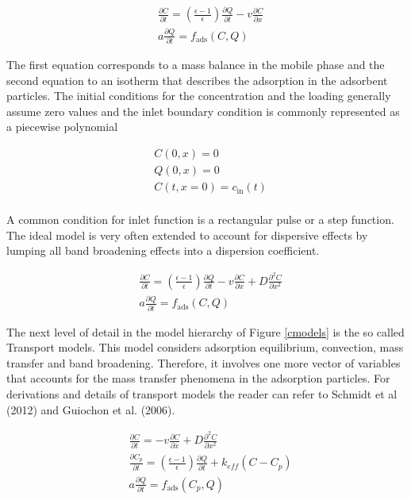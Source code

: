 \documentclass[paper=a4, fontsize=11pt]{scrartcl}
\begin{document}
\begin{align}
\label{idealm}
& \frac{\partial C}{\partial t} = \left(\frac{\epsilon-1}{\epsilon}\right) \frac{\partial Q}{\partial t}-v\frac{\partial C}{\partial x} \\
& a \frac{\partial Q}{\partial t} = f_{\text{ads}}(C,Q)
\end{align}

The first equation corresponds to a mass balance in the mobile phase and the second equation to an isotherm that describes the adsorption in the adsorbent particles. The initial conditions for the concentration and
the loading generally assume zero values and the inlet boundary condition is commonly represented as a piecewise polynomial

\begin{align*}
&C(0,x) = 0\\
&Q(0,x) = 0\\
&C(t,x=0) = c_{\text{in}}(t)\\
\end{align*}

A common condition for inlet function is a rectangular pulse or a step function. The ideal model is very often extended to account for dispersive effects by lumping all band broadening effects into a dispersion coefficient.

\begin{align}
& \frac{\partial C}{\partial t} = \left(\frac{\epsilon-1}{\epsilon}\right) \frac{\partial Q}{\partial t}-v\frac{\partial C}{\partial x} + D\frac{\partial^2C}{\partial x^2}\\
& a \frac{\partial Q}{\partial t} = f_{\text{ads}}(C,Q)
\end{align}

The next level of detail in the model hierarchy of Figure \ref{cmodels} is the so called Transport models. This model considers adsorption equilibrium, convection, mass transfer and band broadening. Therefore, it involves one more vector of variables that accounts for the mass transfer phenomena in the adsorption particles. For derivations and details of transport models the reader can refer to Schmidt et al (2012) and Guiochon et al. (2006). 

\begin{align}
& \frac{\partial C}{\partial t} = -v\frac{\partial C}{\partial x} + D\frac{\partial^2C}{\partial x^2} \\
& \frac{\partial C_p}{\partial t} = \left(\frac{\epsilon-1}{\epsilon}\right) \frac{\partial Q}{\partial t} + k_{eff}(C-C_p)\\
& a \frac{\partial Q}{\partial t} = f_{\text{ads}}(C_p,Q)
\end{align}
\end{document}
